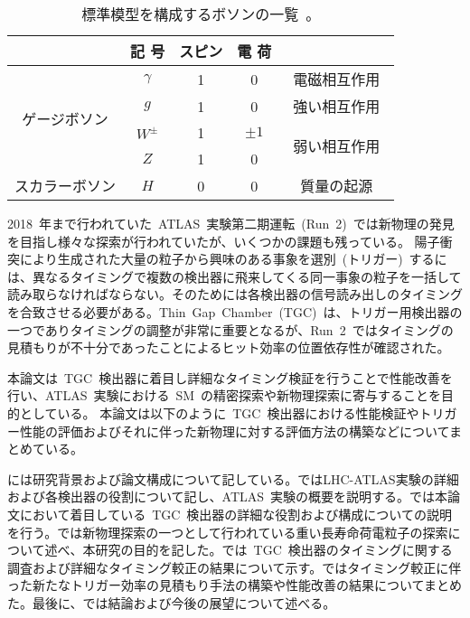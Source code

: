\begin{table}[htbp]
	\centering
	\begin{tabular}{c|c|c|c|c}\hline
	&記 号& スピン & 電 荷 &\\ \hline\hline
	\multirow{4}{*}{ゲージボソン} & $\gamma$ & 1 & 0 & 電磁相互作用　\\
	 & $g$ & 1 & 0 & 強い相互作用　\\
	 & $W^{\pm}$ & 1 & $\pm1$ & \multirow{2}{*}{弱い相互作用}　\\
	 & $Z$ & 1 & 0 &  \\ \hline
	スカラーボソン & $H$ & 0 & 0 & 質量の起源 \\ \hline
	\end{tabular}
	\caption[標準模型を構成するボソンの一覧]{標準模型を構成するボソンの一覧~\cite{URL:10}。}
	\label{tb:SM2}
\end{table}

2018~年まで行われていた~ATLAS~実験第二期運転~(Run~2)~では新物理の発見を目指し様々な探索が行われていたが、いくつかの課題も残っている。
陽子衝突により生成された大量の粒子から興味のある事象を選別~(トリガー)~するには、異なるタイミングで複数の検出器に飛来してくる同一事象の粒子を一括して読み取らなければならない。そのためには各検出器の信号読み出しのタイミングを合致させる必要がある。Thin~Gap~Chamber~(TGC)~\cite{TR:04}は、トリガー用検出器の一つでありタイミングの調整が非常に重要となるが、Run~2~ではタイミングの見積もりが不十分であったことによるヒット効率の位置依存性が確認された。

本論文は~TGC~検出器に着目し詳細なタイミング検証を行うことで性能改善を行い、ATLAS~実験における~SM~の精密探索や新物理探索に寄与することを目的としている。
本論文は以下のように~TGC~検出器における性能検証やトリガー性能の評価およびそれに伴った新物理に対する評価方法の構築などについてまとめている。

には研究背景および論文構成について記している。ではLHC-ATLAS実験の詳細および各検出器の役割について記し、ATLAS~実験の概要を説明する。では本論文において着目している~TGC~検出器の詳細な役割および構成についての説明を行う。では新物理探索の一つとして行われている重い長寿命荷電粒子の探索について述べ、本研究の目的を記した。では~TGC~検出器のタイミングに関する調査および詳細なタイミング較正の結果について示す。ではタイミング較正に伴った新たなトリガー効率の見積もり手法の構築や性能改善の結果についてまとめた。最後に、では結論および今後の展望について述べる。